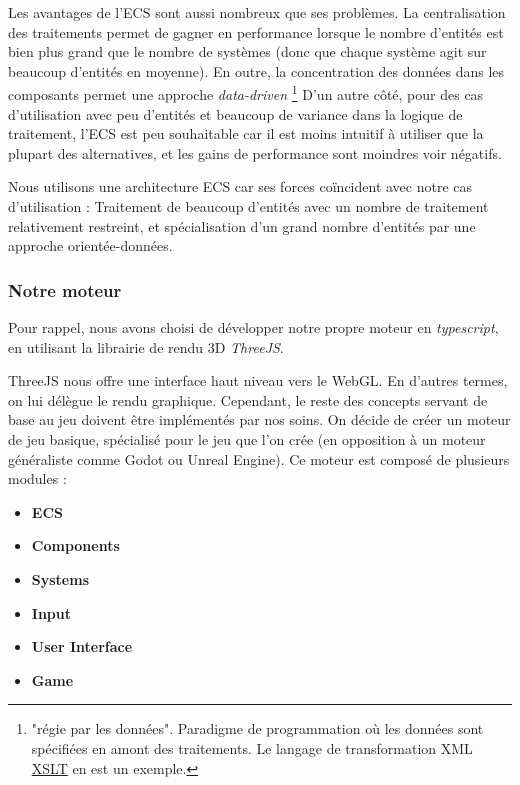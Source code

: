     Les avantages de l'ECS sont aussi nombreux que ses problèmes. La centralisation des traitements permet de gagner en performance lorsque le nombre d'entités est bien plus grand que le nombre de systèmes (donc que chaque système agit sur beaucoup d'entités en moyenne). En outre, la concentration des données dans les composants permet une approche \textit{data-driven}
        \footnote{"régie par les données". Paradigme de programmation où les données sont spécifiées en amont des traitements. Le langage de transformation XML \href{http://www.overleaf.com}{XSLT} en est un exemple.}
    D'un autre côté, pour des cas d'utilisation avec peu d'entités et beaucoup de variance dans la logique de traitement, l'ECS est peu souhaitable car il est moins intuitif à utiliser que la plupart des alternatives, et les gains de performance sont moindres voir négatifs.

    Nous utilisons une architecture ECS car ses forces coïncident avec notre cas d'utilisation : Traitement de beaucoup d'entités avec un nombre de traitement relativement restreint, et spécialisation d'un grand nombre d'entités par une approche orientée-données.


\subsubsection{Notre moteur}
    Pour rappel, nous avons choisi de développer notre propre moteur en \textit{typescript}, en utilisant la librairie de rendu 3D \textit{ThreeJS}.

    ThreeJS nous offre une interface haut niveau vers le WebGL. En d'autres termes, on lui délègue le rendu graphique. Cependant, le reste des concepts servant de base au jeu doivent être implémentés par nos soins. On décide de créer un moteur de jeu basique, spécialisé pour le jeu que l'on crée (en opposition à un moteur généraliste comme Godot ou Unreal Engine). Ce moteur est composé de plusieurs modules :
    
\begin{itemize}
    \item \textbf{ECS}
    \item \textbf{Components}
    \item \textbf{Systems}
    \item \textbf{Input}
    \item \textbf{User Interface}
    \item \textbf{Game}
\end{itemize} 

